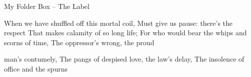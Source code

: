 \documentclass[landscape]{scrartcl}
\begin{document}
\begin{folderbox}{My Folder Box -- The Label}
{{When we have shuffled off this mortal coil,
Must give us pause: there's the respect
That makes calamity of so long life;
For who would bear the whips and scorns of time,
The oppressor's wrong, the proud

man's contumely,
The pangs of despised love, the law's delay,
The insolence of office and the spurns
}
}






\end{folderbox}
\end{document}
